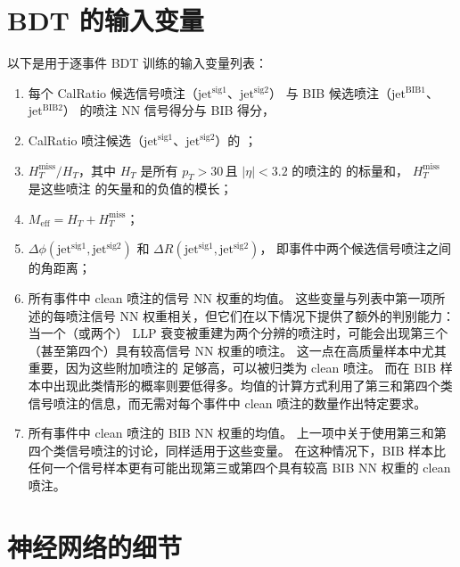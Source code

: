 \chapter{BDT 的输入变量}
\label{cpm:BDT}

以下是用于逐事件 BDT 训练的输入变量列表：

\begin{enumerate}
      \item 每个 CalRatio 候选信号喷注（$\text{jet}^{\text{sig}1}$、$\text{jet}^{\text{sig}2}$）
            与 BIB 候选喷注（$\text{jet}^{\text{BIB}1}$、$\text{jet}^{\text{BIB}2}$）
            的喷注 NN 信号得分与 BIB 得分，

      \item CalRatio 喷注候选（$\text{jet}^{\text{sig}1}$、$\text{jet}^{\text{sig}2}$）的 \pt ；

      \item $H_T^{\text{miss}} / H_T$，其中 $H_T$ 是所有 $p_T > 30$\,\GeV 且 $|\eta| < 3.2$ 的喷注的 \pt 的标量和，
            $H_T^{\text{miss}}$ 是这些喷注 \pt 的矢量和的负值的模长；

      \item $M_{\text{eff}} = H_T + H_T^{\text{miss}} $；

      \item $\Delta \phi (\text{jet}^{\text{sig}1}, \text{jet}^{\text{sig}2})$ 和
            $\Delta R(\text{jet}^{\text{sig}1}, \text{jet}^{\text{sig}2})$，
            即事件中两个候选信号喷注之间的角距离；

      \item 所有事件中 clean 喷注的信号 NN 权重的均值。
            这些变量与列表中第一项所述的每喷注信号 NN 权重相关，但它们在以下情况下提供了额外的判别能力：
            当一个（或两个） LLP 衰变被重建为两个分辨的喷注时，可能会出现第三个（甚至第四个）具有较高信号 NN 权重的喷注。
            这一点在高质量样本中尤其重要，因为这些附加喷注的 \pt 足够高，可以被归类为 clean 喷注。
            而在 BIB 样本中出现此类情形的概率则要低得多。均值的计算方式利用了第三和第四个类信号喷注的信息，而无需对每个事件中 clean 喷注的数量作出特定要求。

      \item 所有事件中 clean 喷注的 BIB NN 权重的均值。
            上一项中关于使用第三和第四个类信号喷注的讨论，同样适用于这些变量。
            在这种情况下，BIB 样本比任何一个信号样本更有可能出现第三或第四个具有较高 BIB NN 权重的 clean 喷注。
\end{enumerate}


\chapter{神经网络的细节}

